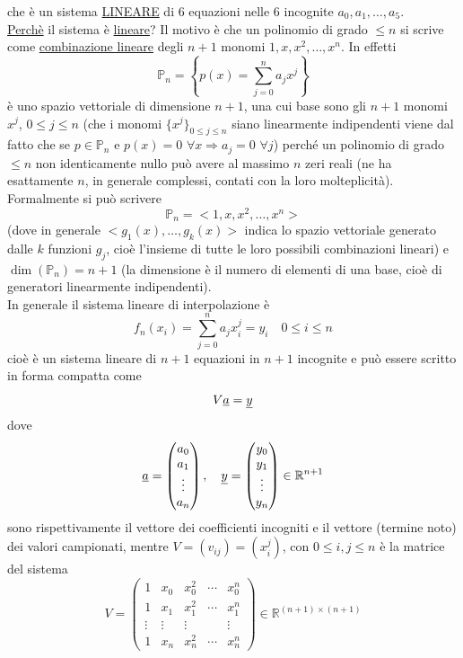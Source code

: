 \documentclass[12pt,headings=optiontohead]{article}
\begin{document}
che è un sistema \uline{LINEARE} di 6 equazioni nelle 6 incognite $a_0,a_1,\dotso,a_5$.\\ 
\uline{Perchè} il sistema è \uline{lineare}? Il motivo è che un polinomio di grado $\leq n$ si scrive come \uline{combinazione lineare} degli $n+1$ monomi $1, x, x^2, \dotso, x^n$. In effetti
\[ \mathbb{P}_n = \left\{p(x) = \sum_{j=0}^n a_j x^j \right\} \]
è uno spazio vettoriale di dimensione $n+1$, una cui base sono gli $n+1$ monomi $x^j$, $0 \leq j \leq n$ (che i monomi $\{ x^j \}_{0 \leq j \leq n}$ siano linearmente indipendenti viene dal fatto che se $p \in \mathbb{P}_n$ e $p(x) = 0$ $\forall x \Rightarrow a_j = 0$ $\forall j$) perché un polinomio di grado $\leq n$ non identicamente nullo può avere al massimo $n$ zeri reali (ne ha esattamente $n$, in generale complessi, contati con la loro molteplicità).\\
Formalmente si può scrivere
\[ \mathbb{P}_n = < 1, x, x^2, \dotso, x^n > \]
(dove in generale $< g_1(x), \dotso, g_k(x) >$ indica lo spazio vettoriale generato dalle $k$ funzioni $g_j$, cioè l'insieme di tutte le loro possibili combinazioni lineari) e $\dim(\mathbb{P}_n) = n+1$ (la dimensione è il numero di elementi di una base, cioè di generatori linearmente indipendenti).\\
In generale il sistema lineare di interpolazione è
\[ f_n(x_i) = \sum_{j=0}^n a_j x_i^j = y_i \quad 0 \le i \le n \]
cioè è un sistema lineare di $n+1$ equazioni in $n+1$ incognite e può essere scritto in forma compatta come
\[ V\uline{a} = \uline{y} \]
dove
\[ \uline{a} = 
    \begin{pmatrix}
    a_0 \\ a_1 \\ \vdots \\ a_n
    \end{pmatrix}, \quad
\uline{y} =
    \begin{pmatrix}
    y_0 \\ y_1 \\ \vdots \\ y_n
    \end{pmatrix}
    \in \mathbb{R}^{n+1} \]
sono rispettivamente il vettore dei coefficienti incogniti e il vettore (termine noto) dei valori campionati, mentre $V = (v_{ij}) = (x_i^j)$, con $0 \leq i,j \leq n$ è la matrice del sistema
\[ V =
    \begin{pmatrix}
    1 & x_0 & x_0^2 & \cdots & x_0^n \\
    1 & x_1 & x_1^2 & \cdots & x_1^n \\
    \vdots & \vdots & \vdots & \ & \vdots \\
    1 & x_n & x_n^2 & \cdots & x_n^n
    \end{pmatrix}
    \in \mathbb{R}^{(n+1) \times (n+1)} \]
\end{document}
